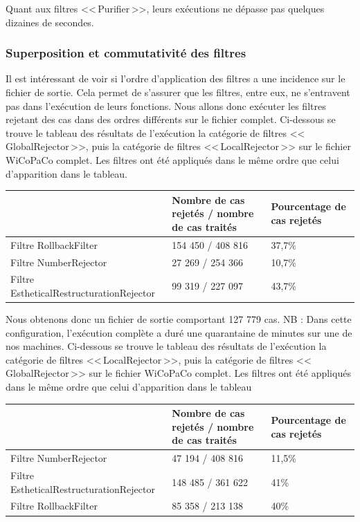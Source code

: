 \documentclass[11pt]{article}
\begin{document}
Quant aux filtres <<\,Purifier\,>>, leurs ex\'{e}cutions ne d\'{e}passe pas quelques dizaines de secondes.



\subsubsection{Superposition et commutativit\'{e} des filtres}
Il est int\'{e}ressant de voir si l'ordre d'application des filtres a une incidence sur le fichier de sortie. Cela permet de s'assurer que les filtres, entre eux, ne s'entravent pas dans l'ex\'{e}cution de leurs fonctions. 
Nous allons donc ex\'{e}cuter les filtres rejetant des cas dans des ordres diff\'{e}rents sur le fichier complet.
\newline
\newline
Ci-dessous se trouve le tableau des r\'{e}sultats de l'ex\'{e}cution la cat\'{e}gorie de filtres <<\,GlobalRejector\,>>, puis la cat\'{e}gorie de filtres <<\,LocalRejector\,>> sur le fichier WiCoPaCo complet. Les filtres ont \'{e}t\'{e} appliqu\'{e}s dans le m\^{e}me ordre que celui d'apparition dans le tableau.
\begin{center}
\begin{tabular}{|M{6cm}|M{5cm}|M{6cm}|}
   \hline
    \, &Nombre de cas rejet\'{e}s / nombre de cas trait\'{e}s & Pourcentage de cas rejet\'{e}s \tabularnewline
   \hline
    Filtre RollbackFilter & 154 450 / 408 816 & 37,7\% \tabularnewline
   \hline
    Filtre NumberRejector & 27 269 / 254 366 & 10,7\% \tabularnewline
\hline
Filtre EstheticalRestructurationRejector & 99 319 / 227 097 & 43,7\% \tabularnewline
\hline
\end{tabular}
\end{center}
Nous obtenons donc un fichier de sortie comportant 127 779 cas.
\newline
NB : Dans cette configuration, l'ex\'{e}cution compl\`{e}te a dur\'{e} une quarantaine de minutes sur une de nos machines.
\newline
\newline
Ci-dessous se trouve le tableau des r\'{e}sultats de l'ex\'{e}cution la cat\'{e}gorie de filtres <<\,LocalRejector\,>>,  puis la cat\'{e}gorie de filtres <<\,GlobalRejector\,>> sur le fichier WiCoPaCo complet. Les filtres ont \'{e}t\'{e} appliqu\'{e}s dans le m\^{e}me ordre que celui d'apparition dans le tableau
\begin{center}
\begin{tabular}{|M{6cm}|M{5cm}|M{6cm}|}
   \hline
    \, &Nombre de cas rejet\'{e}s / nombre de cas trait\'{e}s & Pourcentage de cas rejet\'{e}s \tabularnewline
   \hline
    Filtre NumberRejector & 47 194 / 408 816 & 11,5\% \tabularnewline
\hline
Filtre EstheticalRestructurationRejector & 148 485 / 361 622 & 41\% \tabularnewline
 \hline
    Filtre RollbackFilter & 85 358 / 213 138 & 40\% \tabularnewline
\hline
\end{tabular}
\end{center}
\end{document}
